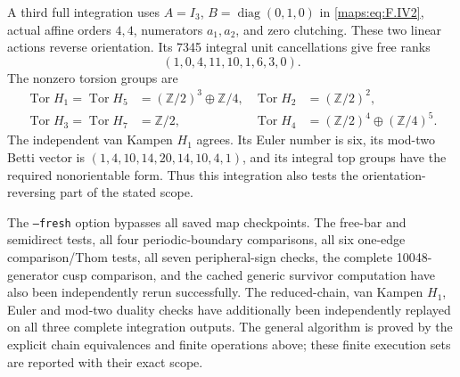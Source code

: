 A third full integration uses
$A=I_3$, $B=\operatorname{diag}(0,1,0)$ in \eqref{maps:eq:F.IV2},
actual affine orders $4,4$, numerators $a_1,a_2$, and zero
clutching.  These two linear actions reverse orientation.
Its 7345 integral unit cancellations give free ranks
\[
                  (1,0,4,11,10,1,6,3,0).
\]
The nonzero torsion groups are
\[
\begin{aligned}
 \operatorname{Tor}H_1=\operatorname{Tor}H_5
       &=(\mathbb Z/2)^3\oplus\mathbb Z/4,&
 \operatorname{Tor}H_2&=(\mathbb Z/2)^2,\\
 \operatorname{Tor}H_3=\operatorname{Tor}H_7
       &=\mathbb Z/2,&
 \operatorname{Tor}H_4&=(\mathbb Z/2)^4\oplus(\mathbb Z/4)^5.
\end{aligned}
\]
The independent van Kampen $H_1$ agrees.  Its Euler number
is six, its mod-two Betti vector is
$(1,4,10,14,20,14,10,4,1)$, and its integral top groups
have the required nonorientable form.  Thus this integration
also tests the orientation-reversing part of the stated scope.

The \texttt{--fresh} option bypasses all saved map checkpoints.
The free-bar and semidirect tests, all four periodic-boundary
comparisons, all six one-edge comparison/Thom tests, all seven
peripheral-sign checks, the complete 10048-generator cusp
comparison, and the cached generic survivor computation have
also been independently rerun successfully.  The
reduced-chain, van Kampen $H_1$, Euler and mod-two duality
checks have additionally been independently replayed on
all three complete integration outputs.  The general
algorithm is proved by the explicit chain equivalences and
finite operations above; these finite execution sets are
reported with their exact scope.







